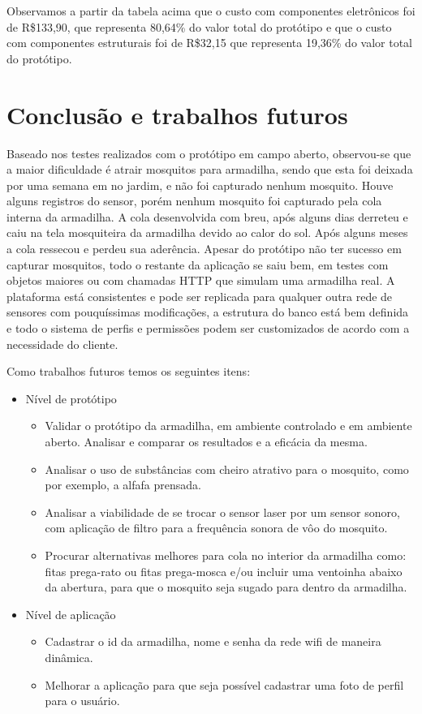 \documentclass[
	12pt,				%
	openright,			%
	oneside,			%
	a4paper,			%
	chapter=TITLE,		%
	english,			%
	brazil				%
	]{abntex2}
\begin{document}
Observamos a partir da tabela acima que o custo com componentes eletrônicos foi de R\$133,90, que representa 80,64\% do valor total do protótipo e que o custo com 
componentes estruturais foi de R\$32,15 que representa 19,36\% do valor total do protótipo.

\chapter{Conclusão e trabalhos futuros}

Baseado nos testes realizados com o protótipo em campo aberto, observou-se que a maior dificuldade é atrair mosquitos para armadilha, sendo que esta foi deixada por uma semana em
no jardim, e não foi capturado nenhum mosquito. Houve alguns registros do  sensor, porém nenhum mosquito foi capturado pela cola interna da armadilha. A cola desenvolvida com breu,
após alguns dias derreteu e caiu na tela mosquiteira da armadilha devido ao calor do sol. Após alguns meses a cola ressecou e perdeu sua aderência. Apesar do protótipo
não ter sucesso em capturar mosquitos, todo o restante da aplicação se saiu bem, em testes com objetos maiores ou com chamadas HTTP que simulam uma armadilha real. A plataforma está 
consistentes e pode ser replicada para qualquer outra rede de sensores com pouquíssimas modificações, a estrutura do banco está bem definida e todo o sistema de perfis e 
permissões podem ser customizados de acordo com a necessidade do cliente.

Como trabalhos futuros temos os seguintes itens: 

\begin{itemize}
    \item Nível de protótipo
    \begin{itemize}
        \item Validar o protótipo da armadilha, em ambiente controlado e em ambiente aberto. Analisar e comparar os resultados e a eficácia da mesma.
        \item Analisar o uso de substâncias com cheiro atrativo para o mosquito, como por exemplo, a alfafa prensada.
        \item Analisar a viabilidade de se trocar o sensor laser por um sensor sonoro, com aplicação de filtro para a frequência sonora de vôo do mosquito.
        \item Procurar alternativas melhores para cola no interior da armadilha como: fitas prega-rato ou fitas prega-mosca e/ou incluir uma 
        ventoinha abaixo da abertura, para que o mosquito seja sugado para dentro da armadilha.
    \end{itemize}
    \item Nível de aplicação
    \begin{itemize}
        \item Cadastrar o id da armadilha, nome e senha da rede wifi de maneira dinâmica.
        \item Melhorar a aplicação para que seja possível cadastrar uma foto de perfil para o usuário.
    \end{itemize}   
\end{itemize}
\end{document}
